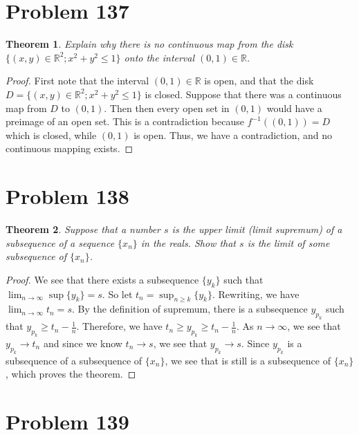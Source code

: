 \documentclass[psamsfonts]{amsart}
\newtheorem{thm}{Theorem}[section]
\theoremstyle{definition}
\theoremstyle{remark}
\numberwithin{equation}{section}
\begin{document}
\section{Problem 137}

\begin{thm}
Explain why there is no continuous map from the disk $\{ (x,y) \in \mathbb{R}^2; x^2 + y^2 \leq 1 \}$ onto the interval $(0,1) \in \mathbb{R}$. 
\end{thm}

\begin{proof}
First note that the interval $(0,1) \in \mathbb{R}$ is open, and that the disk $D = \{ (x,y) \in \mathbb{R}^2; x^2 + y^2 \leq 1 \}$ is closed. Suppose that there was a continuous map from $D$ to $(0,1)$. Then then every open set in $(0,1)$ would have a preimage of an open set. This is a contradiction because $f^{-1}((0,1)) = D$ which is closed, while $(0,1)$ is open. Thus, we have a contradiction, and no continuous mapping exists. 
\end{proof}

\section{Problem 138}

\begin{thm}
Suppose that a number $s$ is the upper limit (limit supremum) of a subsequence of a sequence $\{ x_n \}$ in the reals. Show that $s$ is the limit of some subsequence of $\{ x_n \}$. 
\end{thm}

\begin{proof}
We see that there exists a subsequence $\{ y_k \}$ such that $\lim_{n \to \infty} \sup \{ y_k \} = s$. So let $t_n = \sup_{n \geq k} \{ y_k \}$. Rewriting, we have $\lim_{n \to \infty} t_n = s$. By the definition of supremum, there is a subsequence $y_{p_k}$ such that $y_{p_k} \geq t_n - \frac{1}{n}$. Therefore, we have $t_n \geq y_{p_k} \geq t_n - \frac{1}{n}$. As $n \to \infty$, we see that $y_{p_k} \to t_n$ and since we know $t_n \to s$, we see that $y_{p_k} \to s$. Since $y_{p_k}$ is a subsequence of a subsequence of $\{x_n\}$, we see that is still is a subsequence of $\{x_n \}$, which proves the theorem.
\end{proof}

\section{Problem 139}
\end{document}
